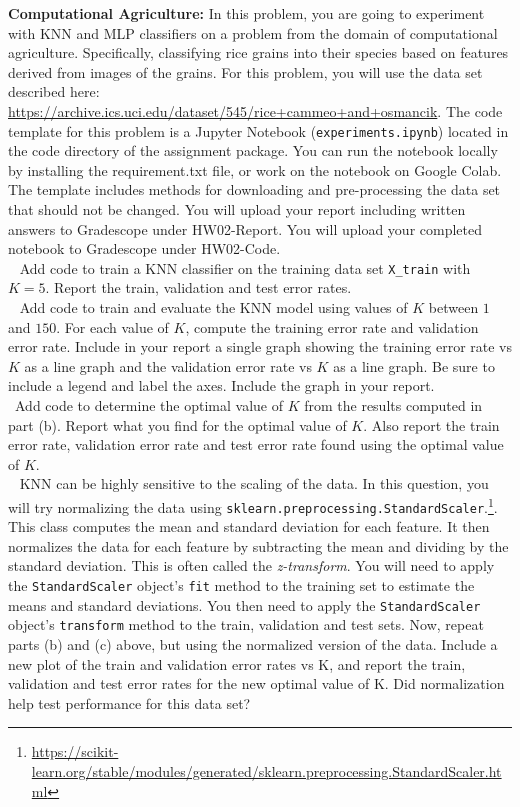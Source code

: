 \documentclass[11pt]{article}
\begin{document}
\begin{problem}{50} 
\textbf{Computational Agriculture:} In this problem, you are going to experiment with KNN and MLP classifiers on a problem from the domain of computational agriculture. Specifically, classifying rice grains into their species based on features derived from images of the grains. 
For this problem, you will use the data set described here: \url{https://archive.ics.uci.edu/dataset/545/rice+cammeo+and+osmancik}. The code template for this problem is a Jupyter Notebook (\texttt{experiments.ipynb}) located in the code directory of the assignment package. You can run the notebook locally by installing the requirement.txt file, or work on the notebook on Google Colab. The template includes methods for downloading and pre-processing the data set that should not be changed. You will upload your report including written answers to Gradescope under HW02-Report. You will upload your completed notebook to Gradescope under HW02-Code. \\

~ Add code to train a KNN classifier on the training data set \texttt{X\_train} with $K=5$. Report the train, validation and test error rates.\\

~ Add code to train and evaluate the KNN model using values of $K$ between $1$ and $150$. For each value of $K$, compute the training error rate and validation error rate. Include in your report a single graph showing the training error rate vs $K$ as a line graph and the validation error rate vs $K$ as a line graph. Be sure to include a legend and label the axes. Include the graph in your report.\\

~Add code to determine the optimal value of $K$ from the results computed in part (b). Report what you find for the optimal value of $K$. Also report the train error rate, validation error rate and test error rate found using the optimal value of $K$. \\

~ KNN can be highly sensitive to the scaling of the data. In this question, you will try normalizing the data using \texttt{sklearn.preprocessing.StandardScaler}.\footnote{\url{https://scikit-learn.org/stable/modules/generated/sklearn.preprocessing.StandardScaler.html}}. This class computes the mean and standard deviation for each feature. It then normalizes the data for each feature by subtracting the mean and dividing by the standard deviation. This is often called the \textit{z-transform}. You will need to apply the \texttt{StandardScaler} object's \texttt{fit} method to the training set to estimate the means and standard deviations. You then need to apply the \texttt{StandardScaler} object's \texttt{transform} method to the train, validation and test sets. Now, repeat parts (b) and (c) above, but using the normalized version of the data. Include a new plot of the train and validation error rates vs K, and report the train, validation and test error rates for the new optimal value of K. Did normalization help test performance for this data set? \\ 


\end{problem}
\end{document}
